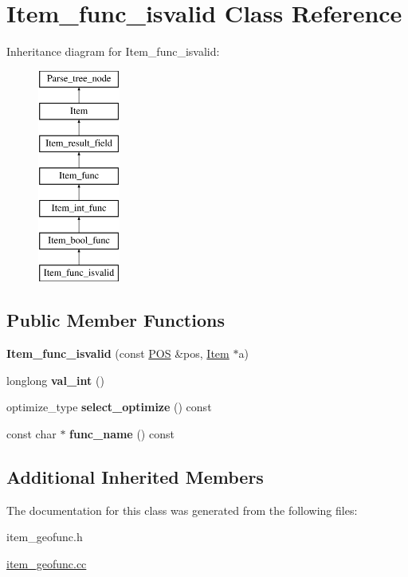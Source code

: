 \hypertarget{classItem__func__isvalid}{}\section{Item\+\_\+func\+\_\+isvalid Class Reference}
\label{classItem__func__isvalid}
Inheritance diagram for Item\+\_\+func\+\_\+isvalid\+:\begin{figure}[H]
\begin{center}
\leavevmode
\includegraphics[height=7.000000cm]{classItem__func__isvalid}
\end{center}
\end{figure}
\subsection*{Public Member Functions}
\begin{DoxyCompactItemize}
\item 
\mbox{\label{classItem__func__isvalid_a23c05358581d15b542cb645d544470a5}} 
{\bfseries Item\+\_\+func\+\_\+isvalid} (const \mbox{\hyperlink{structYYLTYPE}{P\+OS}} \&pos, \mbox{\hyperlink{classItem}{Item}} $\ast$a)
\item 
\mbox{\label{classItem__func__isvalid_ac43dee6089eb4327c47164cfc3344518}} 
longlong {\bfseries val\+\_\+int} ()
\item 
\mbox{\label{classItem__func__isvalid_a8700844fd250532c1d34efbd80935fc3}} 
optimize\+\_\+type {\bfseries select\+\_\+optimize} () const
\item 
\mbox{\label{classItem__func__isvalid_ac1aa903f8a4cb311d86cc4c1ce5fbc67}} 
const char $\ast$ {\bfseries func\+\_\+name} () const
\end{DoxyCompactItemize}
\subsection*{Additional Inherited Members}


The documentation for this class was generated from the following files\+:\begin{DoxyCompactItemize}
\item 
item\+\_\+geofunc.\+h\item 
\mbox{\hyperlink{item__geofunc_8cc}{item\+\_\+geofunc.\+cc}}\end{DoxyCompactItemize}
